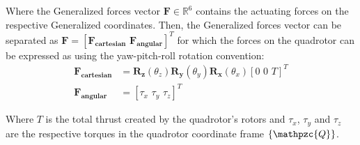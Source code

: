 \documentclass[letterpaper, 12pt]{article}
\begin{document}
Where the Generalized forces vector $\mathbf{F} \in \mathbb{R}^6$ contains the actuating forces on the respective Generalized coordinates.  Then, the Generalized forces vector can be separated as $\mathbf{F} = [\mathbf{F_{cartesian}} \,\, \mathbf{F_{angular}}]^T$ for which the forces on the quadrotor can be expressed as \cite{Corke_Springer_2011} using the yaw-pitch-roll rotation convention:
\begin{align}
\mathbf{F_{cartesian}} &= \mathbf{R_z}(\theta_z) \mathbf{R_y}(\theta_y)  \mathbf{R_x}(\theta_x)[0\,\,0\,\, T]^T \\
\mathbf{F_{angular}} &=  [\tau_x \,\, \tau_y \,\, \tau_z]^T
\label{eq:Quadrotor Forces}
\end{align}

Where $T$ is the total thrust created by the quadrotor's rotors and $\tau_x$, $\tau_y$ and $\tau_z$ are the respective torques in the quadrotor coordinate frame $\lbrace\mathpzc{Q}\rbrace$.




\end{document}
